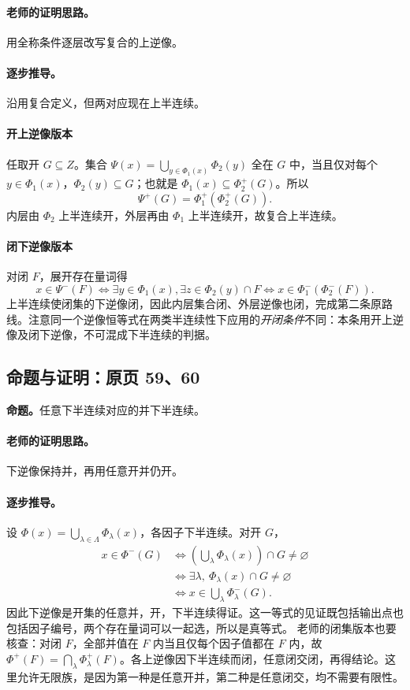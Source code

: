 \paragraph{老师的证明思路。}用全称条件逐层改写复合的上逆像。

\paragraph{逐步推导。}
沿用复合定义，但两对应现在上半连续。
\paragraph{开上逆像版本}任取开 $G\subseteq Z$。集合 $\Psi(x)=\bigcup_{y\in\Phi_1(x)}\Phi_2(y)$ 全在 $G$ 中，当且仅对每个 $y\in\Phi_1(x)$，$\Phi_2(y)\subseteq G$；也就是 $\Phi_1(x)\subseteq\Phi_2^+(G)$。所以
\[\Psi^+(G)=\Phi_1^+(\Phi_2^+(G)).\]
内层由 $\Phi_2$ 上半连续开，外层再由 $\Phi_1$ 上半连续开，故复合上半连续。
\paragraph{闭下逆像版本}对闭 $F$，展开存在量词得
\[x\in\Psi^-(F)\iff\exists y\in\Phi_1(x),\exists z\in\Phi_2(y)\cap F\iff x\in\Phi_1^-(\Phi_2^-(F)).\]
上半连续使闭集的下逆像闭，因此内层集合闭、外层逆像也闭，完成第二条原路线。注意同一个逆像恒等式在两类半连续性下应用的\emph{开闭条件}不同：本条用开上逆像及闭下逆像，不可混成下半连续的判据。


\subsection{命题与证明：原页 59、60}

\textbf{命题。}任意下半连续对应的并下半连续。

\paragraph{老师的证明思路。}下逆像保持并，再用任意开并仍开。

\paragraph{逐步推导。}
设 $\Phi(x)=\bigcup_{\lambda\in\Lambda}\Phi_\lambda(x)$，各因子下半连续。对开 $G$，
\begin{align*}
x\in\Phi^-(G)&\iff\left(\bigcup_\lambda\Phi_\lambda(x)\right)\cap G\ne\varnothing\\
&\iff\exists\lambda,\ \Phi_\lambda(x)\cap G\ne\varnothing\\
&\iff x\in\bigcup_\lambda\Phi_\lambda^-(G).
\end{align*}
因此下逆像是开集的任意并，开，下半连续得证。这一等式的见证既包括输出点也包括因子编号，两个存在量词可以一起选，所以是真等式。
老师的闭集版本也要核查：对闭 $F$，全部并值在 $F$ 内当且仅每个因子值都在 $F$ 内，故 $\Phi^+(F)=\bigcap_\lambda\Phi_\lambda^+(F)$。各上逆像因下半连续而闭，任意闭交闭，再得结论。这里允许无限族，是因为第一种是任意开并，第二种是任意闭交，均不需要有限性。


